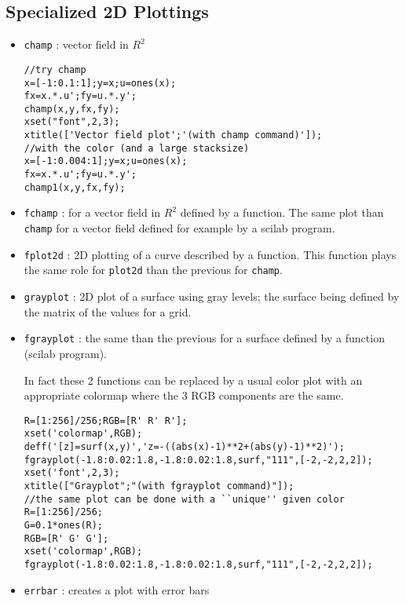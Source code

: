 \subsection{Specialized 2D Plottings}
%
\begin{itemize}
        \item \verb+champ+	: vector field in $R^{2}$

\begin{verbatim}
//try champ
x=[-1:0.1:1];y=x;u=ones(x);
fx=x.*.u';fy=u.*.y';
champ(x,y,fx,fy);
xset("font",2,3);
xtitle(['Vector field plot';'(with champ command)']);
//with the color (and a large stacksize)
x=[-1:0.004:1];y=x;u=ones(x);
fx=x.*.u';fy=u.*.y';
champ1(x,y,fx,fy);
\end{verbatim}




	\item \verb+fchamp+	: for a vector field in $R^{2}$ defined by a 
function. The same plot than {\tt champ} for a vector field defined
for example by a scilab program.

	\item \verb+fplot2d+	: 2D plotting of a curve described by a 
function. This function plays the same role for {\tt plot2d} than the 
previous for {\tt champ}.

	\item \verb+grayplot+	: 2D plot of a surface using gray
levels; the surface being defined by the matrix of the values
for a grid.

	\item \verb+fgrayplot+	: the same than the previous for a
surface defined by a function (scilab program).

In fact these 2 functions can be replaced by a usual color plot with
an appropriate colormap where the 3 RGB components are the same.

\begin{verbatim}
R=[1:256]/256;RGB=[R' R' R'];
xset('colormap',RGB);
deff('[z]=surf(x,y)','z=-((abs(x)-1)**2+(abs(y)-1)**2)');
fgrayplot(-1.8:0.02:1.8,-1.8:0.02:1.8,surf,"111",[-2,-2,2,2]);
xset('font',2,3);
xtitle(["Grayplot";"(with fgrayplot command)"]);
//the same plot can be done with a ``unique'' given color
R=[1:256]/256;
G=0.1*ones(R);
RGB=[R' G' G'];
xset('colormap',RGB);
fgrayplot(-1.8:0.02:1.8,-1.8:0.02:1.8,surf,"111",[-2,-2,2,2]);
\end{verbatim}



	\item \verb+errbar+	: creates a plot with error bars
\end{itemize}
%


